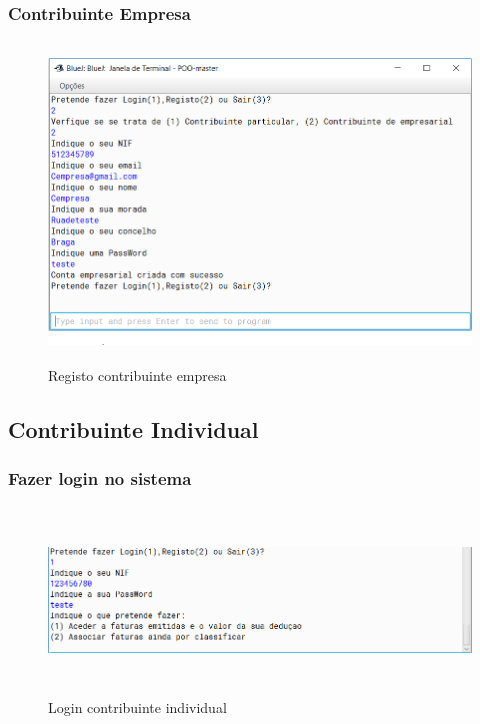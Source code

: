 \documentclass[a4paper]{article}
\begin{document}
		\subsubsection{Contribuinte Empresa}

			\begin{figure}[htbp]
				\centering
				\includegraphics[width = 420pt,height = 240pt]{Ceregisto.png}
				\caption{Registo contribuinte empresa}
			\end{figure}

	\subsection{Contribuinte Individual}
		\subsubsection{Fazer login no sistema}
			\begin{figure}[htbp]
				\centering
				\includegraphics[width = 320pt,height = 140pt]{loginci.png}
				\caption{Login contribuinte individual}
			\end{figure}
\end{document}
